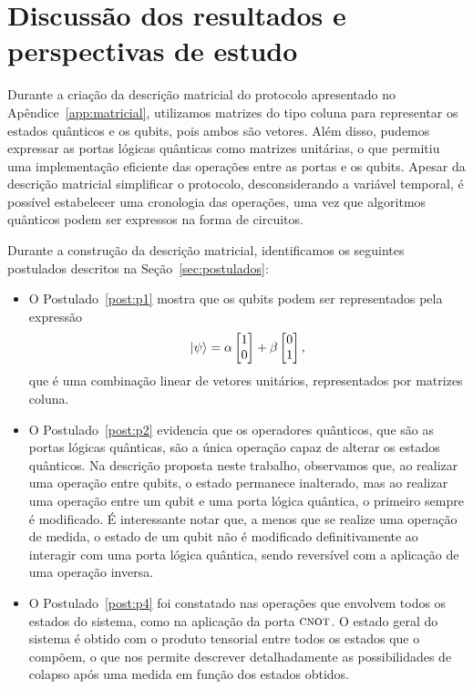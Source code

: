 \chapter{Discussão dos resultados e perspectivas de estudo}\label{sec:resultados}

Durante a criação da descrição matricial do protocolo apresentado no Apêndice~\ref{app:matricial}, utilizamos matrizes do tipo coluna para representar os estados quânticos e os qubits, pois ambos são vetores. Além disso, pudemos expressar as portas lógicas quânticas como matrizes unitárias, o que permitiu uma implementação eficiente das operações entre as portas e os qubits. Apesar da descrição matricial simplificar o protocolo, desconsiderando a variável temporal, é possível estabelecer uma cronologia das operações, uma vez que algoritmos quânticos podem ser expressos na forma de circuitos.

Durante a construção da descrição matricial, identificamos os seguintes postulados descritos na Seção~\ref{sec:postulados}:
\begin{itemize}
  \item O Postulado~\ref{post:p1} mostra que os qubits podem ser representados pela expressão
        \[
        \ket{\psi} =
        \alpha \begin{bmatrix} 1 \\ 0 \end{bmatrix} +
        \beta \begin{bmatrix} 0 \\ 1 \end{bmatrix},
        \]
        que é uma combinação linear de vetores unitários, representados por matrizes coluna.

  \item O Postulado~\ref{post:p2} evidencia que os operadores quânticos, que são as portas lógicas quânticas, são a única operação capaz de alterar os estados quânticos. Na descrição proposta neste trabalho, observamos que, ao realizar uma operação entre qubits, o estado permanece inalterado, mas ao realizar uma operação entre um qubit e uma porta lógica quântica, o primeiro sempre é modificado. É interessante notar que, a menos que se realize uma operação de medida, o estado de um qubit não é modificado definitivamente ao interagir com uma porta lógica quântica, sendo reversível com a aplicação de uma operação inversa.

  \item O Postulado~\ref{post:p4} foi constatado nas operações que envolvem todos os estados do sistema, como na aplicação da porta \(\operatorname{\textsc{cnot}}\). O estado geral do sistema é obtido com o produto tensorial entre todos os estados que o compõem, o que nos permite descrever detalhadamente as possibilidades de colapso após uma medida em função dos estados obtidos.
\end{itemize}

